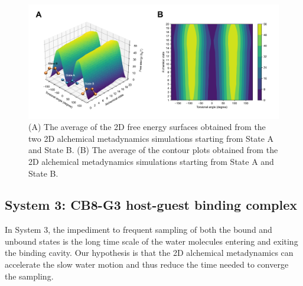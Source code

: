 \documentclass[journal=jacsat,manuscript=article]{achemso}
\begin{document}
\begin{figure}[H]
    \centering
    \includegraphics[width=\textwidth]{Figures/sys2_fes_contour_avg_annotated.png}   
    \caption{(A) The average of the 2D free energy surfaces obtained from the two 2D alchemical metadynamics simulations starting from State A and State B. (B) The average of the contour plots obtained from the 2D alchemical metadynamics simulations starting from State A and State B.}
    \label{sys2_fes_contour}
\end{figure}

\subsection{System 3: CB8-G3 host-guest binding complex}
In System 3, the impediment to frequent sampling of both the bound and unbound states is the long time scale of the water molecules entering and exiting the binding cavity. Our hypothesis is that the 2D alchemical metadynamics can accelerate the slow water motion and thus reduce the time needed to converge the sampling. 
\end{document}
